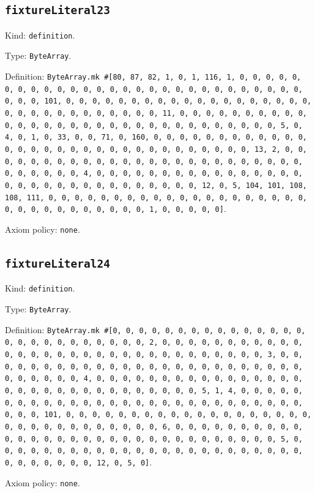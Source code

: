 \documentclass[11pt]{article}
\begin{document}
\subsection*{\texttt{fixtureLiteral23}}
\noindent Kind: \texttt{definition}.\par
\noindent Type: \texttt{ByteArray}.\par
\noindent Definition: \texttt{ByteArray.mk \#[80, 87, 82, 1, 0, 1, 116, 1, 0, 0, 0, 0, 0, 0, 0, 0, 0, 0, 0, 0, 0, 0, 0, 0, 0, 0, 0, 0, 0, 0, 0, 0, 0, 0, 0, 0, 0, 0, 0, 101, 0, 0, 0, 0, 0, 0, 0, 0, 0, 0, 0, 0, 0, 0, 0, 0, 0, 0, 0, 0, 0, 0, 0, 0, 0, 0, 0, 0, 0, 0, 0, 11, 0, 0, 0, 0, 0, 0, 0, 0, 0, 0, 0, 0, 0, 0, 0, 0, 0, 0, 0, 0, 0, 0, 0, 0, 0, 0, 0, 0, 0, 0, 0, 5, 0, 4, 0, 1, 0, 33, 0, 0, 71, 0, 160, 0, 0, 0, 0, 0, 0, 0, 0, 0, 0, 0, 0, 0, 0, 0, 0, 0, 0, 0, 0, 0, 0, 0, 0, 0, 0, 0, 0, 0, 0, 0, 13, 2, 0, 0, 0, 0, 0, 0, 0, 0, 0, 0, 0, 0, 0, 0, 0, 0, 0, 0, 0, 0, 0, 0, 0, 0, 0, 0, 0, 0, 0, 0, 0, 4, 0, 0, 0, 0, 0, 0, 0, 0, 0, 0, 0, 0, 0, 0, 0, 0, 0, 0, 0, 0, 0, 0, 0, 0, 0, 0, 0, 0, 0, 0, 0, 12, 0, 5, 104, 101, 108, 108, 111, 0, 0, 0, 0, 0, 0, 0, 0, 0, 0, 0, 0, 0, 0, 0, 0, 0, 0, 0, 0, 0, 0, 0, 0, 0, 0, 0, 0, 0, 0, 0, 1, 0, 0, 0, 0, 0]}.\par
\noindent Axiom policy: \texttt{none}.\par
\subsection*{\texttt{fixtureLiteral24}}
\noindent Kind: \texttt{definition}.\par
\noindent Type: \texttt{ByteArray}.\par
\noindent Definition: \texttt{ByteArray.mk \#[0, 0, 0, 0, 0, 0, 0, 0, 0, 0, 0, 0, 0, 0, 0, 0, 0, 0, 0, 0, 0, 0, 0, 0, 0, 0, 2, 0, 0, 0, 0, 0, 0, 0, 0, 0, 0, 0, 0, 0, 0, 0, 0, 0, 0, 0, 0, 0, 0, 0, 0, 0, 0, 0, 0, 0, 0, 0, 3, 0, 0, 0, 0, 0, 0, 0, 0, 0, 0, 0, 0, 0, 0, 0, 0, 0, 0, 0, 0, 0, 0, 0, 0, 0, 0, 0, 0, 0, 0, 0, 4, 0, 0, 0, 0, 0, 0, 0, 0, 0, 0, 0, 0, 0, 0, 0, 0, 0, 0, 0, 0, 0, 0, 0, 0, 0, 0, 0, 0, 0, 0, 0, 5, 1, 4, 0, 0, 0, 0, 0, 0, 0, 0, 0, 0, 0, 0, 0, 0, 0, 0, 0, 0, 0, 0, 0, 0, 0, 0, 0, 0, 0, 0, 0, 0, 0, 101, 0, 0, 0, 0, 0, 0, 0, 0, 0, 0, 0, 0, 0, 0, 0, 0, 0, 0, 0, 0, 0, 0, 0, 0, 0, 0, 0, 0, 0, 0, 0, 6, 0, 0, 0, 0, 0, 0, 0, 0, 0, 0, 0, 0, 0, 0, 0, 0, 0, 0, 0, 0, 0, 0, 0, 0, 0, 0, 0, 0, 0, 0, 0, 5, 0, 0, 0, 0, 0, 0, 0, 0, 0, 0, 0, 0, 0, 0, 0, 0, 0, 0, 0, 0, 0, 0, 0, 0, 0, 0, 0, 0, 0, 0, 0, 12, 0, 5, 0]}.\par
\noindent Axiom policy: \texttt{none}.\par
\end{document}
